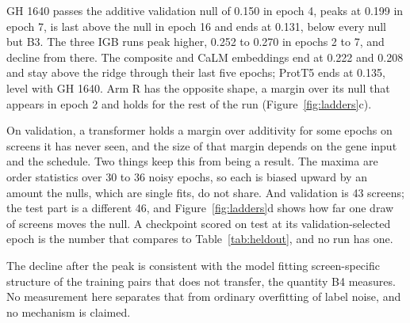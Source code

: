 GH 1640 passes the additive validation null of 0.150 in epoch 4, peaks at 0.199 in
epoch 7, is last above the null in epoch 16 and ends at 0.131, below every null but
B3. The three IGB runs peak higher, 0.252 to 0.270 in epochs 2 to 7, and decline
from there. The composite and CaLM embeddings end at 0.222 and 0.208 and stay above
the ridge through their last five epochs; ProtT5 ends at 0.135, level with GH 1640.
Arm R has the opposite shape, a margin over its null that appears in epoch 2 and
holds for the rest of the run (Figure~\ref{fig:ladders}c).

On validation, a transformer holds a margin over additivity for some epochs on
screens it has never seen, and the size of that margin depends on the gene input
and the schedule. Two things keep this from being a result. The maxima are order
statistics over 30 to 36 noisy epochs, so each is biased upward by an amount the
nulls, which are single fits, do not share. And validation is 43 screens; the test
part is a different 46, and Figure~\ref{fig:ladders}d shows how far one draw of
screens moves the null. A checkpoint scored on test at its validation-selected
epoch is the number that compares to Table~\ref{tab:heldout}, and no run has one.

The decline after the peak is consistent with the model fitting screen-specific
structure of the training pairs that does not transfer, the quantity B4 measures.
No measurement here separates that from ordinary overfitting of label noise, and
no mechanism is claimed.
